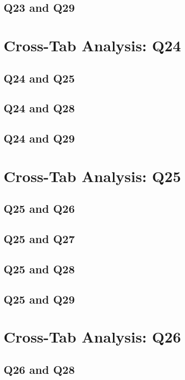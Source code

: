 \documentclass{report}
\begin{document}
\section{Q23 and Q29}\clearpage

\chapter{Cross-Tab Analysis: Q24}

\section{Q24 and Q25}\clearpage
\section{Q24 and Q28}\clearpage
\section{Q24 and Q29}\clearpage

\chapter{Cross-Tab Analysis: Q25}

\section{Q25 and Q26}\clearpage
\section{Q25 and Q27}\clearpage
\section{Q25 and Q28}\clearpage
\section{Q25 and Q29}\clearpage

\chapter{Cross-Tab Analysis: Q26}

\section{Q26 and Q28}\clearpage
\end{document}
